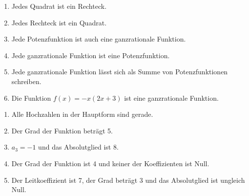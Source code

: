 \begin{Exercise}[title={Nimm zu folgenden Aussagen Stellung:}, label=ganzHauptA2]
	
	\begin{minipage}{\textwidth}
			\begin{enumerate}[label=\alph*)]
				\item Jedes Quadrat ist ein Rechteck.
				\item Jedes Rechteck ist ein Quadrat.
				\item Jede Potenzfunktion ist auch eine ganzrationale Funktion.
				\item Jede ganzrationale Funktion ist eine Potenzfunktion.
				\item Jede ganzrationale Funktion lässt sich als Summe von Potenzfunktionen schreiben. 
				\item Die Funktion \(f(x)=-x(2x+3)\) ist eine ganzrationale Funktion.
			\end{enumerate}
	\end{minipage}%
\end{Exercise}
\newpage

\begin{Exercise}[title={Gib jeweils eine mögliche Funktionsgleichung einer ganzrationalen Funktion an:}, label=ganzHauptA3]
	
	\begin{minipage}{\textwidth}
		\begin{enumerate}[label=\alph*)]
			\item Alle Hochzahlen in der Hauptform sind gerade.
			\item Der Grad der Funktion beträgt 5.
			\item \(a_3=-1\) und das Absolutglied ist 8.
			\item Der Grad der Funktion ist 4 und keiner der Koeffizienten ist Null.
			\item Der Leitkoeffizient ist 7, der Grad beträgt 3 und das Absolutglied ist ungleich Null.
		\end{enumerate}
	\end{minipage}%
\end{Exercise}

